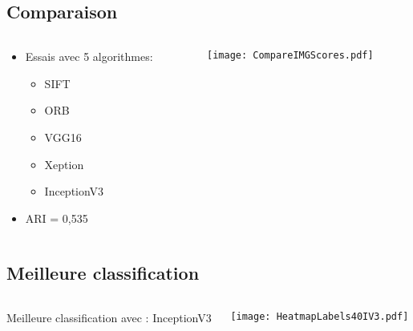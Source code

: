 \documentclass[8pt,aspectratio=169,hyperref={unicode=true}]{beamer}
\begin{document}
\subsection{Comparaison}
\begin{frame}{\insertsubsection}
    \begin{columns}
        \begin{column}{.4\textwidth}
            \begin{itemize}
                \item Essais avec 5 algorithmes:
                      \begin{itemize}
                          \item SIFT
                          \item ORB
                          \item VGG16
                          \item Xeption
                          \item InceptionV3
                      \end{itemize}
                \item ARI = 0,535
            \end{itemize}
        \end{column}
        \begin{column}{.6\textwidth}
            \texttt{[image: CompareIMGScores.pdf]}
        \end{column}
    \end{columns}
\end{frame}

\subsection{Meilleure classification}
\begin{frame}{\insertsubsection}
    \begin{columns}
        \begin{column}{.4\textwidth}
            Meilleure classification avec : InceptionV3
        \end{column}
        \begin{column}{.6\textwidth}
            \texttt{[image: HeatmapLabels40IV3.pdf]}
        \end{column}
    \end{columns}
\end{frame}
\end{document}
